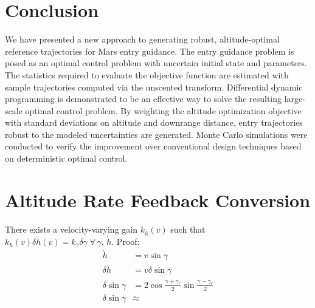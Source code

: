 \documentclass[journal ]{new-aiaa}
\begin{document}
\section*{Conclusion}

We have presented a new approach to generating robust, altitude-optimal reference trajectories for Mars entry guidance. The entry guidance problem is posed as an optimal control problem with uncertain initial state and parameters. The statistics required to evaluate the objective function are estimated with sample trajectories computed via the unscented transform. Differential dynamic programming is demonstrated to be an effective way to solve the resulting large-scale optimal control problem. By weighting the altitude optimization objective with standard deviations on altitude and downrange distance, entry trajectories robust to the modeled uncertainties are generated. Monte Carlo simulations were conducted to verify the improvement over conventional design techniques based on deterministic optimal control. 
\appendix
\section*{Altitude Rate Feedback Conversion}
There exists a velocity-varying gain $k_{\dot{h}}(v)$ such that $k_{\dot{h}}(v)\delta\dot{h}(v) = k_{\gamma}\delta\gamma\;\forall\,\gamma,\, \dot{h}$.
Proof: 
\begin{align}
\dot{h} &= v\sin\gamma \\
\delta \dot{h} &= v\delta\sin\gamma \\
\delta\sin\gamma &= 2\cos\frac{\gamma+\gamma_r}{2}\sin\frac{\gamma-\gamma_r}{2} \\
\delta\sin\gamma &\approx 
\end{align}

\end{document}
